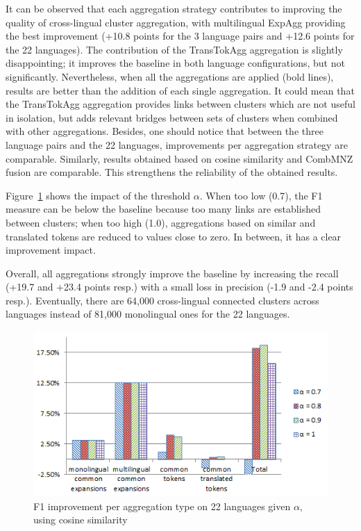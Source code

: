 \documentclass[output=paper]{langsci/langscibook}
\begin{document}
It can be observed that each aggregation strategy contributes to
improving the quality of cross-lingual cluster aggregation, with
multilingual ExpAgg providing the best improvement (+10.8 points for
the 3 language pairs and +12.6 points for the 22 languages). The
contribution of the TransTokAgg aggregation is slightly
disappointing; it improves the baseline in both language
configurations, but not significantly.  Nevertheless, when all the
aggregations are applied (bold lines), results are better than the
addition of each single aggregation. It could mean that the
TransTokAgg aggregation provides links between clusters which are
not useful in isolation, but adds relevant bridges between sets of
clusters when combined with other aggregations. Besides, one should
notice that between the three language pairs and the 22 languages,
improvements per aggregation strategy are comparable. Similarly,
results obtained based on cosine similarity and CombMNZ fusion are
comparable.  This strengthens the reliability of the obtained results.

Figure~\ref{jac:fig:Eval22l} shows the impact of the threshold
$\alpha$. When too low (0.7), the F1 measure can be below the baseline
because too many links are established between clusters; when too high
(1.0), aggregations based on similar and translated tokens are reduced
to values close to zero.  In between, it has a clear improvement
impact.

Overall, all aggregations strongly improve the baseline by increasing
the recall (+19.7 and +23.4 points resp.) with a small loss in
precision (-1.9 and -2.4 points resp.). Eventually, there are 64,000
cross-lingual connected clusters across languages instead of 81,000
monolingual ones for the 22 languages.

\begin{figure}
\includegraphics[scale=0.6]{figures/cosine_average_all_ln_improvment1}
\caption{F1 improvement per aggregation type on 22 languages given $\alpha$, using cosine similarity}
\label{jac:fig:Eval22l}
\end{figure}
\end{document}
